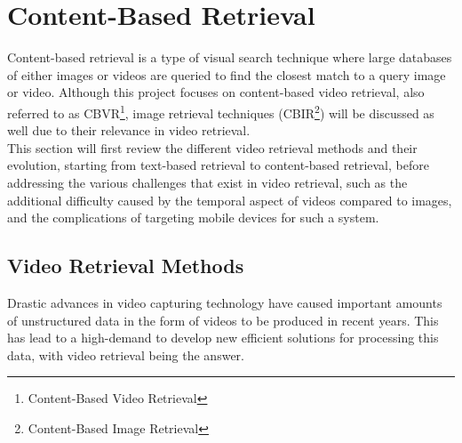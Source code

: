 \section{Content-Based Retrieval}

Content-based retrieval is a type of visual search technique where large databases of either images or videos are queried to find the closest match to a query image or video. Although this project focuses on content-based video retrieval, also referred to as CBVR\footnote{Content-Based Video Retrieval}, image retrieval techniques (CBIR\footnote{Content-Based Image Retrieval}) will be discussed as well due to their relevance in video retrieval.\\

This section will first review the different video retrieval methods and their evolution, starting from text-based retrieval to content-based retrieval, before addressing the various challenges that exist in video retrieval, such as the additional difficulty caused by the temporal aspect of videos compared to images, and the complications of targeting mobile devices for such a system.


\subsection{Video Retrieval Methods}
\label{sec:cbvr-methods}

Drastic advances in video capturing technology have caused important amounts of unstructured data in the form of videos to be produced in recent years. This has lead to a high-demand to develop new efficient solutions for processing this data, with video retrieval being the answer.\\

